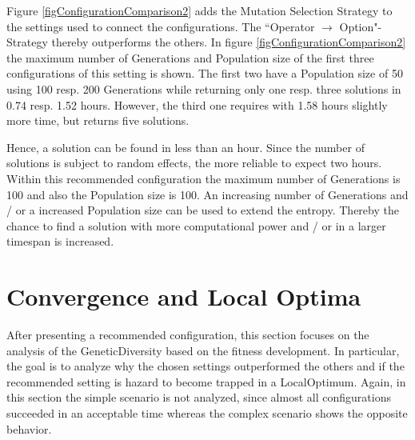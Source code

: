 Figure \ref{figConfigurationComparison2} adds the Mutation Selection Strategy to the settings used to connect the configurations. The ``Operator $\rightarrow$ Option"-Strategy thereby outperforms the others. In figure \ref{figConfigurationComparison2} the maximum number of \glspl{Generation} and \gls{Population} size of the first three configurations of this setting is shown. The first two have a \gls{Population} size of 50 using 100 resp. 200 \glspl{Generation} while returning only one resp. three solutions in 0.74 resp. 1.52 hours. However, the third one requires with 1.58 hours slightly more time, but returns five solutions.

Hence, a solution can be found in less than an hour. Since the number of solutions is subject to random effects, the more reliable to expect two hours. Within this recommended configuration the maximum number of \glspl{Generation} is 100 and also the \gls{Population} size is 100. An increasing number of \glspl{Generation} and / or a increased \gls{Population} size can be used to extend the entropy. Thereby the chance to find a solution with more computational power and / or in a larger timespan is increased.



\section{Convergence and Local Optima} %
\label{secConvergenceAndLocalOptimum}

After presenting a recommended configuration, this section focuses on the analysis of the \gls{GeneticDiversity} based on the fitness development. In particular, the goal is to analyze why the chosen settings outperformed the others and if the recommended setting is hazard to become trapped in a \gls{LocalOptimum}. Again, in this section the simple scenario is not analyzed, since almost all configurations succeeded in an acceptable time whereas the complex scenario shows the opposite behavior.

